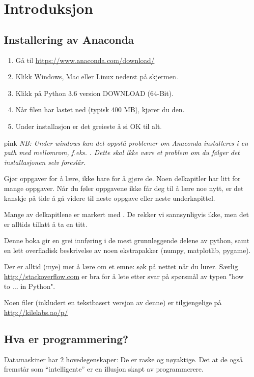 \chapter{Introduksjon}
\section{Installering av Anaconda}
\begin{enumerate}[nosep]
\item Gå til \url{https://www.anaconda.com/download/}
\item Klikk Windows, Mac eller Linux nederst på skjermen.
\item Klikk på Python 3.6 version  DOWNLOAD  (64-Bit).
\item Når filen har lastet ned (typisk 400 MB), kjører du den.
\item Under installasjon er det greieste å si OK til alt.
\end{enumerate}
\begin{usncbox}{pink}
{\em NB: Under windows kan det oppstå problemer om Anaconda installeres i en path med mellomrom, f.eks. . Dette skal ikke være et problem om du følger det installasjonen selv foreslår.}
\end{usncbox}

Gjør oppgaver for å lære, ikke bare for å gjøre de. Noen delkapitler har litt for mange oppgaver. Når du føler oppgavene ikke får deg til å lære noe nytt, er det kanskje på tide å gå videre til neste oppgave eller neste underkapittel. 

Mange av delkapitlene er markert med {\emoptional}. De rekker vi sannsynligvis ikke, men det er alltids tillatt å ta en titt. 

Denne boka gir en grei innføring i de mest grunnleggende delene av python, samt en lett overfladisk beskrivelse av noen ekstrapakker (numpy, matplotlib, pygame). 

Der er alltid (mye) mer å lære om et emne: søk på nettet når du lurer. Særlig \url{http://stackoverflow.com} er bra for å lete etter svar på spørsmål av typen "how to ... in Python". 

Noen filer (inkludert en tekstbasert versjon av denne) er tilgjengelige på \url{http://kilelabs.no/p/}

\section{Hva er programmering?}
Datamaskiner har 2 hovedegenskaper: De er raske og nøyaktige. Det at de også fremstår som ``intelligente'' er en illusjon skapt av programmerere.

